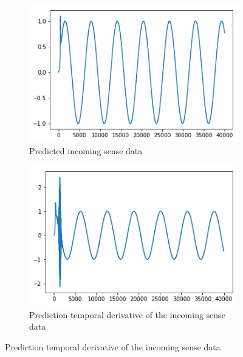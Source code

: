 \begin{figure}[H]
\bigskip
\begin{subfigure}{.32\linewidth}
 \centering
 \includegraphics[width=0.8\linewidth]{chapter_3_figures/dynamics_sine_wave_predphi.png}
 \caption{Predicted incoming sense data}
\end{subfigure}
 \hfill
\begin{subfigure}{.32\linewidth}
 \centering
 \includegraphics[width=0.8\linewidth]{chapter_3_figures/dynamics_sine_wave_pred_phidot.png}
 \caption{Prediction temporal derivative of the incoming sense data}
\end{subfigure}

\bigskip
 

\end{figure}
